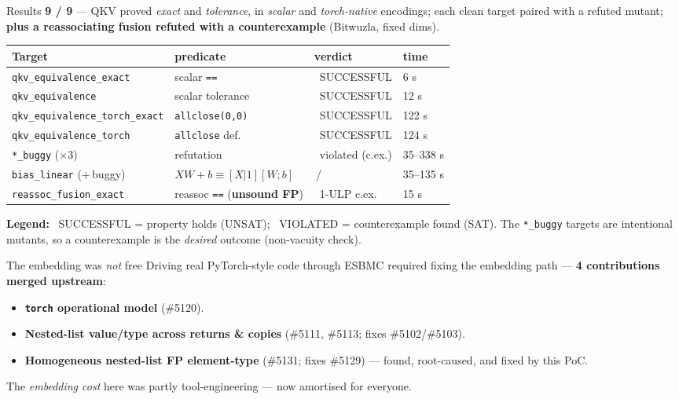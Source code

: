 \documentclass[aspectratio=169,11pt]{beamer}
\newcommand{\good}{\textcolor{ok}{\ding{51}}}
\newcommand{\bad}{\textcolor{warn}{\ding{55}}}
\begin{document}
\begin{frame}{Results}
  \textbf{9 / 9} --- QKV proved \emph{exact} and \emph{tolerance}, in \emph{scalar} and
  \emph{torch-native} encodings; each clean target paired with a refuted mutant; \textbf{plus a
  reassociating fusion refuted with a counterexample} (Bitwuzla, fixed dims).

  \medskip
  \begin{tabular}{@{}llll@{}}
    \toprule
    \textbf{Target} & \textbf{predicate} & \textbf{verdict} & \textbf{time} \\
    \midrule
    \texttt{qkv\_equivalence\_exact} & scalar \texttt{==} & \good\ SUCCESSFUL & 6 s \\
    \texttt{qkv\_equivalence} & scalar tolerance & \good\ SUCCESSFUL & 12 s \\
    \texttt{qkv\_equivalence\_torch\_exact} & \texttt{allclose(0,0)} & \good\ SUCCESSFUL & 122 s \\
    \texttt{qkv\_equivalence\_torch} & \texttt{allclose} def. & \good\ SUCCESSFUL & 124 s \\
    \texttt{*\_buggy} ($\times 3$) & refutation & \bad\ violated (c.ex.) & 35--338 s \\
    \texttt{bias\_linear} (+\,buggy) & $XW{+}b \equiv [X|1][W;b]$ & \good\,/\,\bad & 35--135 s \\
    \texttt{reassoc\_fusion\_exact} & reassoc \texttt{==} (\textbf{unsound FP}) & \bad\ 1-ULP c.ex. & 15 s \\
    \bottomrule
  \end{tabular}

  \medskip
  {\footnotesize \textbf{Legend:} \good\ SUCCESSFUL = property holds (UNSAT);\quad
  \bad\ VIOLATED = counterexample found (SAT). The \texttt{*\_buggy} targets are intentional
  mutants, so a counterexample is the \emph{desired} outcome (non-vacuity check).}
\end{frame}

\begin{frame}{The embedding was \emph{not} free}
  Driving real PyTorch-style code through ESBMC required fixing the embedding path ---
  \textbf{4 contributions merged upstream}:
  \begin{itemize}
    \item \textbf{\texttt{torch} operational model} (\#5120).
    \item \textbf{Nested-list value/type across returns \& copies} (\#5111, \#5113; fixes \#5102/\#5103).
    \item \textbf{Homogeneous nested-list FP element-type} (\#5131; fixes \#5129) --- found, root-caused,
      and fixed by this PoC.
  \end{itemize}
  \begin{block}{}
    \centering The \emph{embedding cost} here was partly tool-engineering --- now amortised for everyone.
  \end{block}
\end{frame}
\end{document}
